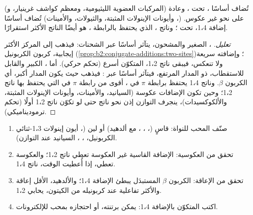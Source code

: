 \begin{proposition}[أي موقع]\label{prop:b2:conjugate-additions:regio}
 (المركبات العضوية الليثيومية، ومعظم كواشف غرينيار، و) تُضاف أساسًا ، تحت ، وعادة على نحو غير عكوس.  (، وأيونات الإينولات المثبتة، والثيولات،
والأمينات) تُضاف أساسًا إضافة 1،4، تحت ؛ وناتج ، الذي يحتفظ بالرابطة ، هو
أيضًا الناتج الأكثر استقرارًا.
\end{proposition}

\begin{proof}[تعليل]
، الصغير والمشحون، يتآثر أساسًا عبر الشحنات: فيذهب إلى المركز الأكثر
إيجابية، كربون الكربونيل (\cref{prop:b2:conjugate-additions:two-sites})؛ وإضافته سريعة 
ولا تنعكس، فيبقى ناتج 1،2، المتكوّن أسرع (تحكم حركي). أما ،
الكبير والقابل للاستقطاب، ذو المدار  المرتفع، فيتآثر أساسًا عبر : فيذهب حيث
يكون المدار  أكبر، أي الكربون $\beta$. وناتج 1،4 يحتفظ برابطة $\pi$ في ، أقوى من
رابطة $\pi$ في  التي يحتفظ بها ناتج 1،2؛ وحين تكون الإضافات عكوسة (السيانيد، والأمينات،
وأيونات الإينولات المثبتة، والألكوكسيدات)، ينجرف التوازن إذن نحو ناتج  حتى لو تكوّن
ناتج 1،2 أولًا (تحكم ترموديناميكي).
\end{proof}

\begin{method}\label{met:b2:conjugate-additions:predict-mode}
\begin{enumerate}
  \item صنّف المحب للنواة: قاسٍ (، ، ،  مع ألدهيد)
        أو لين (، أيون إينولات 1،3-ثنائي الكربونيل، ، ، السيانيد عند التوازن).
  \item تحقق من العكوسية: الإضافة القاسية غير العكوسة تعطي ناتج 1،2؛ والعكوسة تعطي،
        إذا أُعطيت الوقت، ناتج 1،4.
  \item تحقق من الإعاقة: الكربون $\beta$ المستبدَل يبطئ الإضافة 1،4؛ والألدهيد، الأقل إعاقة
        والأكثر تفاعلية عند كربونيله من الكيتون، يحابي 1،2.
  \item اكتب  المتكوّن بالإضافة 1،4: يمكن برتنته، أو احتجازه بمحب
        للإلكترونات.
\end{enumerate}
\end{method}

